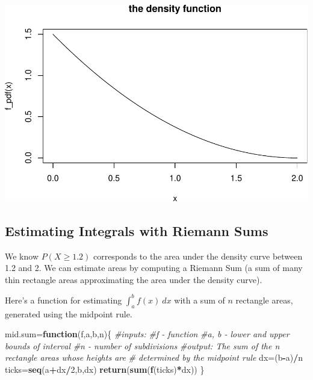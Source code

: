 \documentclass[
]{book}
\newenvironment{Shaded}{\begin{snugshade}}{\end{snugshade}}
\newcommand{\CommentTok}[1]{\textcolor[rgb]{0.56,0.35,0.01}{\textit{#1}}}
\newcommand{\ControlFlowTok}[1]{\textcolor[rgb]{0.13,0.29,0.53}{\textbf{#1}}}
\newcommand{\DecValTok}[1]{\textcolor[rgb]{0.00,0.00,0.81}{#1}}
\newcommand{\FunctionTok}[1]{\textcolor[rgb]{0.13,0.29,0.53}{\textbf{#1}}}
\newcommand{\NormalTok}[1]{#1}
\newcommand{\OtherTok}[1]{\textcolor[rgb]{0.56,0.35,0.01}{#1}}
\newcommand{\SpecialCharTok}[1]{\textcolor[rgb]{0.81,0.36,0.00}{\textbf{#1}}}
\theoremstyle{definition}
\theoremstyle{definition}
\theoremstyle{definition}
\theoremstyle{definition}
\theoremstyle{remark}
\begin{document}
\includegraphics{math340-notes_files/figure-latex/plot pdf-1.pdf}

\subsection{Estimating Integrals with Riemann Sums}\label{estimating-integrals-with-riemann-sums}

We know \(P(X \geq 1.2)\) corresponds to the area under the density curve between 1.2 and 2. We can estimate areas by computing a Riemann Sum (a sum of many thin rectangle areas approximating the area under the density curve).

Here's a function for estimating \(\int_a^b f(x)~dx\) with a sum of \(n\) rectangle areas, generated using the midpoint rule.

\begin{Shaded}
\begin{Highlighting}[]
\NormalTok{mid.sum}\OtherTok{=}\ControlFlowTok{function}\NormalTok{(f,a,b,n)\{}
  \CommentTok{\#inputs:}
      \CommentTok{\#f {-} function}
      \CommentTok{\#a, b {-} lower and upper bounds of interval}
      \CommentTok{\#n {-} number of subdivisions}
  \CommentTok{\#output: The sum of the n rectangle areas whose heights are}
  \CommentTok{\# determined by the midpoint rule}
\NormalTok{  dx}\OtherTok{=}\NormalTok{(b}\SpecialCharTok{{-}}\NormalTok{a)}\SpecialCharTok{/}\NormalTok{n}
\NormalTok{  ticks}\OtherTok{=}\FunctionTok{seq}\NormalTok{(a}\SpecialCharTok{+}\NormalTok{dx}\SpecialCharTok{/}\DecValTok{2}\NormalTok{,b,dx)}
  \FunctionTok{return}\NormalTok{(}\FunctionTok{sum}\NormalTok{(}\FunctionTok{f}\NormalTok{(ticks)}\SpecialCharTok{*}\NormalTok{dx))}
\NormalTok{\}}
\end{Highlighting}
\end{Shaded}
\end{document}
